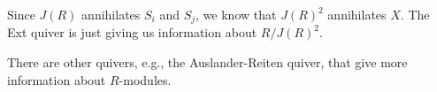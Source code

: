 Since $J(R)$ annihilates $S_i$ and $S_j$, we know that
$J(R)^2$ annihilates $X$. The Ext quiver is just giving us information about
$R/J(R)^2$.

There are other quivers, e.g., the Auslander-Reiten quiver, that give more
information about $R$-modules.
